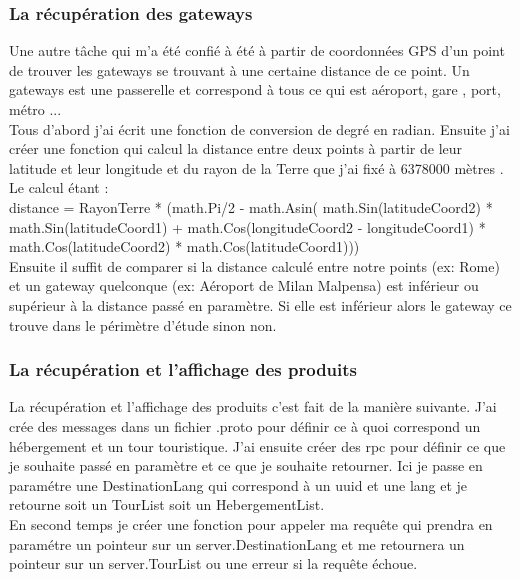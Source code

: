 \documentclass[12pt,a4paper]{report}
\begin{document}
\subsubsection{La récupération des  gateways}

Une autre tâche qui m'a été confié à été à partir de coordonnées GPS d'un point de trouver les gateways se trouvant à une certaine distance de ce point. Un gateways est une passerelle et correspond à tous ce qui est aéroport, gare , port, métro ...\\

Tous d'abord j'ai écrit une fonction de conversion de degré en radian. Ensuite j'ai créer une fonction qui calcul la distance entre deux points à partir de leur latitude et leur longitude et du rayon de la Terre que j'ai fixé à 6378000 mètres .\\

Le calcul étant :\\

distance = RayonTerre * (math.Pi/2 - math.Asin( math.Sin(latitudeCoord2) * math.Sin(latitudeCoord1) + math.Cos(longitudeCoord2 - longitudeCoord1) * math.Cos(latitudeCoord2) * math.Cos(latitudeCoord1)))\\

Ensuite il suffit de comparer si la distance calculé entre notre points (ex: Rome) et un gateway quelconque (ex: Aéroport de Milan Malpensa)  est inférieur ou supérieur à la distance passé en paramètre. Si elle est inférieur alors le gateway ce trouve dans le périmètre d'étude sinon non.

\newpage

\subsubsection{La récupération et l'affichage des  produits}

La récupération et l'affichage des produits c'est fait de la manière suivante. J'ai crée des messages dans un fichier .proto pour définir ce à quoi correspond un hébergement et un tour touristique. J'ai ensuite créer des rpc pour définir ce que je souhaite passé en paramètre et ce que je souhaite retourner. Ici je passe en paramétre une DestinationLang qui correspond à un uuid et une lang et je retourne soit un TourList soit un HebergementList.\\

 En second temps je créer une fonction pour appeler ma requête qui prendra en paramétre un pointeur sur un server.DestinationLang et me retournera un pointeur sur un server.TourList ou une erreur si la requête échoue.\\
 
\end{document}
